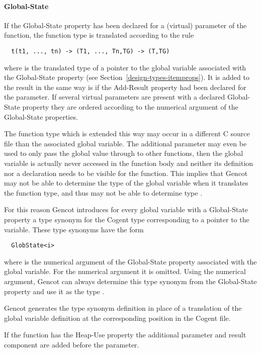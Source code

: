 \paragraph{Global-State}

If the Global-State property has been declared for a (virtual) parameter of the function, the function type is translated 
according to the rule
\begin{verbatim}
  t(t1, ..., tn) -> (T1, ..., Tn,TG) -> (T,TG)
\end{verbatim}
where  is the translated type of a pointer to the global variable associated with the Global-State property
(see Section~\ref{design-types-itemprops}). It is added to the result in the same way is if the Add-Result property 
had been declared for the parameter. If several virtual parameters are present with a declared Global-State property 
they are ordered according to the numerical argument of the Global-State properties. 

The function type which is extended this way may occur in a different C source file than the associated global variable.
The additional parameter may even be used to only pass the global value through to other functions, then the global variable 
is actually never accessed in the function body and neither its definition nor a declaration needs to be visible for
the function. This implies that Gencot may not be able to determine the type of the global variable when it translates 
the function type, and thus may not be able to determine type . 

For this reason Gencot introduces for every global variable with a Global-State property a type synonym for the Cogent 
type corresponding to a pointer to the variable. These type synonyms have the form
\begin{verbatim}
  GlobState<i>
\end{verbatim}
where  is the numerical argument of the Global-State property associated with the global variable. For 
the numerical argument  it is omitted. Using the numerical argument, Gencot can always determine this type synonym
from the Global-State property and use it as the type . 

Gencot generates the type synonym definition in place of a translation of the global variable definition at the corresponding
position in the Cogent file.

If the function has the 
Heap-Use property the additional parameter and result component are added before the  parameter.


